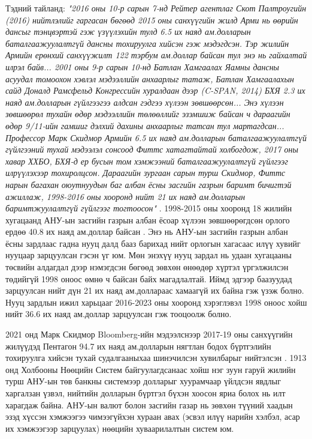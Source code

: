 \documentclass[10pt,twocolumn,letterpaper]{article}
\begin{document}
Тэдний тайланд: \textit{"2016 оны 10-р сарын 7-нд Рейтер агентлаг Скот Палтроугийн (2016) нийтлэлийг гаргасан бөгөөд 2015 оны санхүүгийн жилд Арми нь өөрийн дансыг тэнцвэртэй гэж үзүүлэхийн тулд 6.5 их наяд ам.долларын баталгаажуулалтгүй дансны тохируулга хийсэн гэж мэдэгдсэн. Тэр жилийн Армийн ерөнхий санхүүжилт 122 тэрбум ам.доллар байсан тул энэ нь гайхалтай илрэл байв... 2001 оны 9-р сарын 10-нд Батлан Хамгаалах Яамны дансны асуудал томоохон хэвлэл мэдээллийн анхаарлыг татаж, Батлан Хамгаалахын сайд Доналд Рамсфельд Конгрессийн хуралдаан дээр (C-SPAN, 2014) БХЯ 2.3 их наяд ам.долларын гүйлгээгээ алдсан гэдгээ хүлээн зөвшөөрсөн... Энэ хүлээн зөвшөөрөл тухайн өдөр мэдээллийн төлөөллийг эзэмшиж байсан ч дараагийн өдөр 9/11-ийн гамшиг дэлхий дахины анхаарлыг татсан тул мартагдсан... Профессор Марк Скидмор Армийн 6.5 их наяд ам.долларын баталгаажуулалтгүй гүйлгээний тухай мэдээлэл сонсоод Фиттс хатагтайтай холбогдож, 2017 оны хавар ХХБО, БХЯ-д ер бусын том хэмжээний баталгаажуулалтгүй гүйлгээг илрүүлэхээр тохиролцсон. Дараагийн зургаан сарын турш Скидмор, Фиттс нарын багахан оюутнуудын баг албан ёсны засгийн газрын баримт бичигтэй ажиллаж, 1998-2016 оны хооронд нийт 21 их наяд ам.долларын баримтжуулалтгүй гүйлгээг тогтоосон"} \cite{12}.
1998-2015 оны хооронд 18 жилийн хугацаанд АНУ-ын засгийн газрын албан ёсоар хүлээн зөвшөөрөгдсөн орлого ердөө 40.8 их наяд ам.доллар байсан \cite{15}. Энэ нь АНУ-ын засгийн газрын албан ёсны зардлаас гадна нууц далд бааз барихад нийт орлогын хагасаас илүү хувийг нууцаар зарцуулсан гэсэн үг юм. Мөн энэхүү нууц зардал нь удаан хугацааны төсвийн алдагдал дээр нэмэгдсэн бөгөөд зөвхөн өнөөдөр хүртэл үргэлжилсэн төдийгүй 1998 оноос өмнө ч байсан байх магадлалтай. Иймд эдгээр баазуудад зарцуулсан нийт дүн 21 их наяд ам.доллараас хамаагүй их байна гэж үзэж болно. Нууц зардлын ижил харьцааг 2016-2023 оны хооронд хэрэглэвэл 1998 оноос хойш нийт 36.6 их наяд ам.доллар зарцуулсан гэж тооцоолж болно.

2021 онд Марк Скидмор Bloomberg-ийн мэдээлснээр 2017-19 оны санхүүгийн жилүүдэд Пентагон 94.7 их наяд ам.долларын нягтлан бодох бүртгэлийн тохируулга хийсэн тухай судалгааныхаа шинэчилсэн хувилбарыг нийтэлсэн \cite{17,18}. 1913 онд Холбооны Нөөцийн Систем байгуулагдсанаас хойш нэг зуун гаруй жилийн турш АНУ-ын төв банкны системээр долларыг хуурамчаар үйлдсэн явдлыг \cite{37} харгалзан үзвэл, нийтийн долларын бүртгэл бүхэн хоосон яриа болох нь илт харагдаж байна. АНУ-ын валют болон засгийн газар нь зөвхөн түүний хаадын эзэд хүссэн хэмжээгээ чимээгүйхэн хураан авах (эсвэл илүү нарийн хэлбэл, асар их хэмжээгээр зарцуулах) нөөцийн хуваарилалтын систем юм.
\end{document}
